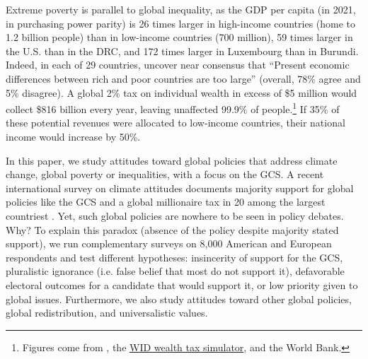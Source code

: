 Extreme poverty is parallel to global inequality, as the GDP per capita (in 2021, in purchasing power parity) is 26 times larger in high-income countries (home to 1.2 billion people) than in low-income countries (700 million), 59 times larger in the U.S. than in the DRC, and 172 times larger in Luxembourg than in Burundi. Indeed, in each of 29 countries, \citet{issp_international_2019} uncover near consensus that ``Present economic differences between rich and poor countries are too large'' (overall, 78\% agree and 5\% disagree). A global 2\% tax on individual wealth in excess of \$5 million would collect \$816 billion every year, leaving unaffected 99.9\% of people.\footnote{Figures come from \citet{chancel_world_2022}, the \href{https://wid.world/world-wealth-tax-simulator/}{WID wealth tax simulator}, and the World Bank.} If 35\% of these potential revenues were allocated to low-income countries, their national income would increase by 50\%. %


In this paper, we study attitudes toward global policies that address climate change, global poverty or inequalities, with a focus on the GCS. A recent international survey on climate attitudes documents majority support for global policies like the GCS and a global millionaire tax in 20 among the largest countriest \citep{dechezlepretre_fighting_2022}. %
Yet, such global policies are nowhere to be seen in policy debates. Why? To explain this paradox (absence of the policy despite majority stated support), we run complementary surveys on 8,000 American and European respondents and test different hypotheses: insincerity of support for the GCS, pluralistic ignorance (i.e. false belief that most do not support it), defavorable electoral outcomes for a candidate that would support it, or low priority given to global issues. Furthermore, we also study attitudes toward other global policies, global redistribution, and universalistic values.

